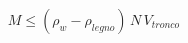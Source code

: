 \documentclass[preview]{standalone}
\begin{document}
\begin{align*}
\quad M \le (\rho_w-\rho_{legno})\, N\, V_{tronco}
\end{align*}
\end{document}
